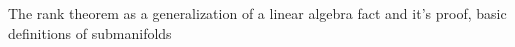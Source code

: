 The rank theorem as a generalization of a linear algebra fact and it's proof, basic definitions of submanifolds